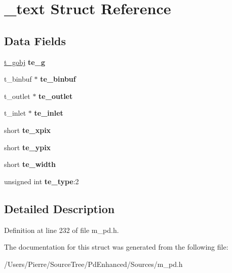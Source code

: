 \hypertarget{struct__text}{\section{\-\_\-text Struct Reference}
\label{struct__text}
}
\subsection*{Data Fields}
\begin{DoxyCompactItemize}
\item 
\hypertarget{struct__text_a2a1d03c47dc522ee54abf232b686d967}{\hyperlink{struct__gobj}{t\-\_\-gobj} {\bfseries te\-\_\-g}}\label{struct__text_a2a1d03c47dc522ee54abf232b686d967}

\item 
\hypertarget{struct__text_abd723d92731b3203626cd3659d803979}{t\-\_\-binbuf $\ast$ {\bfseries te\-\_\-binbuf}}\label{struct__text_abd723d92731b3203626cd3659d803979}

\item 
\hypertarget{struct__text_abd5fa9b012cb076294ca3a02619b0c08}{t\-\_\-outlet $\ast$ {\bfseries te\-\_\-outlet}}\label{struct__text_abd5fa9b012cb076294ca3a02619b0c08}

\item 
\hypertarget{struct__text_a974a2ba622d24866ec9ff114cd8b6304}{t\-\_\-inlet $\ast$ {\bfseries te\-\_\-inlet}}\label{struct__text_a974a2ba622d24866ec9ff114cd8b6304}

\item 
\hypertarget{struct__text_abfa7d8a29cf174c52ff21e300bbc6024}{short {\bfseries te\-\_\-xpix}}\label{struct__text_abfa7d8a29cf174c52ff21e300bbc6024}

\item 
\hypertarget{struct__text_a1b09541116146f438ed8967942e375e0}{short {\bfseries te\-\_\-ypix}}\label{struct__text_a1b09541116146f438ed8967942e375e0}

\item 
\hypertarget{struct__text_a5b41ab2c4ac78a6337d9b3c9439c46ff}{short {\bfseries te\-\_\-width}}\label{struct__text_a5b41ab2c4ac78a6337d9b3c9439c46ff}

\item 
\hypertarget{struct__text_af7108f5ddfff3bb67e5c350d29ceb9a5}{unsigned int {\bfseries te\-\_\-type}\-:2}\label{struct__text_af7108f5ddfff3bb67e5c350d29ceb9a5}

\end{DoxyCompactItemize}


\subsection{Detailed Description}


Definition at line 232 of file m\-\_\-pd.\-h.



The documentation for this struct was generated from the following file\-:\begin{DoxyCompactItemize}
\item 
/\-Users/\-Pierre/\-Source\-Tree/\-Pd\-Enhanced/\-Sources/m\-\_\-pd.\-h\end{DoxyCompactItemize}
